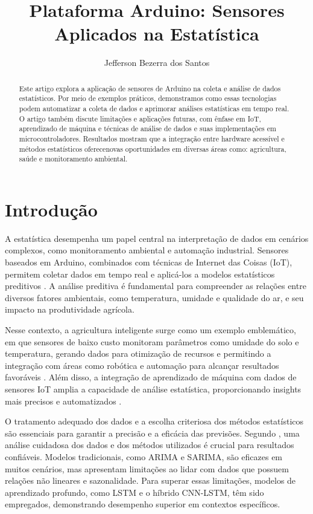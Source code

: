 \documentclass[12pt, a4paper]{article}
\title{Plataforma Arduino: Sensores  Aplicados na Estatística}
\author{Jefferson Bezerra dos Santos}
\date{}
\begin{document}
\maketitle

\begin{abstract}
    Este artigo explora a aplicação de sensores de Arduino na coleta e análise de dados estatísticos.
    Por meio de exemplos práticos, demonstramos como essas tecnologias podem automatizar a coleta de dados e
    aprimorar análises estatísticas em tempo real. O artigo também discute limitações e aplicações futuras, com
    ênfase em IoT, aprendizado de máquina e técnicas de análise de dados e suas implementações em
    microcontroladores. Resultados mostram que a integração entre hardware acessível e métodos estatísticos
    oferecenovas oportunidades em diversas áreas como: agricultura, saúde e monitoramento ambiental.
\end{abstract}

\section{Introdução}
\label{sec:introducao}
A estatística desempenha um papel central na interpretação de dados em cenários complexos, como monitoramento ambiental
e automação industrial. Sensores baseados em Arduino, combinados com técnicas de Internet das Coisas (IoT),
permitem coletar dados em tempo real e aplicá-los a modelos estatísticos preditivos \cite{NARAYANA2024e28195}. A análise
preditiva é fundamental para compreender as relações entre diversos fatores ambientais, como temperatura, umidade e
qualidade do ar, e seu impacto na produtividade agrícola. 

Nesse contexto, a agricultura inteligente surge como um exemplo emblemático, em que sensores de baixo custo monitoram
parâmetros como umidade do solo e temperatura, gerando dados para otimização de recursos e permitindo a integração com
áreas como robótica e automação para alcançar resultados favoráveis \cite{narayan2024}. Além disso, a integração de
aprendizado de máquina com dados de sensores IoT amplia a capacidade de análise estatística, proporcionando insights
mais precisos e automatizados \cite{Adi2020}. 

O tratamento adequado dos dados e a escolha criteriosa dos métodos estatísticos são essenciais para garantir a precisão
e a eficácia das previsões. Segundo \cite{Selmy2024}, uma análise cuidadosa dos dados e dos métodos utilizados é crucial
para resultados confiáveis. Modelos tradicionais, como ARIMA e SARIMA, são eficazes em muitos cenários, mas apresentam
limitações ao lidar com dados que possuem relações não lineares e sazonalidade. Para superar essas limitações, modelos
de aprendizado profundo, como LSTM e o híbrido CNN-LSTM, têm sido empregados, demonstrando desempenho superior em
contextos específicos.
\end{document}
